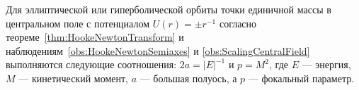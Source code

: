 \documentclass[
	extrafontsizes,
	11pt,
	hyphens,
]{memoir}
\begin{document}
%
%
%


\begin{observation}
Для эллиптической или гиперболической орбиты%
\label{obs:KeplerOrbitExactGeometry}
точки единичной массы в центральном поле с потенциалом \(U(r) = \pm r^{-1}\)
согласно теореме~\ref{thm:HookeNewtonTransform} и наблюдениям~\ref{obs:HookeNewtonSemiaxes} и \ref{obs:ScalingCentralField}
выполняются следующие соотношения: \(2a = \lvert E \rvert^{-1}\) и \(p = M^2\), где \(E\) --- энергия, \(M\) --- кинетический момент, \(a\) --- большая полуось, а \(p\) --- фокальный параметр.
\end{observation}
\end{document}
